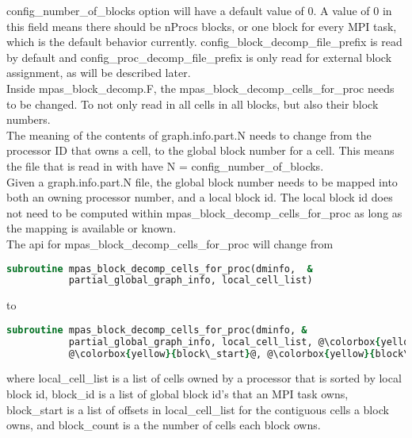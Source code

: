 \documentclass[11pt]{report}
\begin{document}
config\_number\_of\_blocks option will have a default value of
0. A value of 0 in this field means there should be nProcs blocks, or one block
for every MPI task, which is the default behavior currently.
config\_block\_decomp\_file\_prefix is read by default and
config\_proc\_decomp\_file\_prefix is only read for external block assignment,
as will be described later.\\

Inside mpas\_block\_decomp.F, the mpas\_block\_decomp\_cells\_for\_proc needs
to be changed.  To not only read in all cells in all blocks, but also their
block numbers. \\

The meaning of the contents of graph.info.part.N needs to change from the
processor ID that owns a cell, to the global block number for a cell. This
means the file that is read in with have N = config\_number\_of\_blocks. \\

Given a graph.info.part.N file, the global block number needs to be mapped into
both an owning processor number, and a local block id. The local block id does
not need to be computed within mpas\_block\_decomp\_cells\_for\_proc as long as
the mapping is available or known. \\

The api for mpas\_block\_decomp\_cells\_for\_proc will change from

\begin{lstlisting}[language=fortran,escapechar=@,frame=single]
subroutine mpas_block_decomp_cells_for_proc(dminfo,  &
           partial_global_graph_info, local_cell_list)
\end{lstlisting}

to

\begin{lstlisting}[language=fortran,escapechar=@,frame=single]
subroutine mpas_block_decomp_cells_for_proc(dminfo, &
           partial_global_graph_info, local_cell_list, @\colorbox{yellow}{block\_id}@, &
		   @\colorbox{yellow}{block\_start}@, @\colorbox{yellow}{block\_count}@)
\end{lstlisting}

where local\_cell\_list is a list of cells owned by a processor that is sorted
by local block id, block\_id is a list of global block id's that an MPI task
owns, block\_start is a list of offsets in local\_cell\_list for the contiguous
cells a block owns, and block\_count is a the number of cells each block owns. \\
\end{document}
